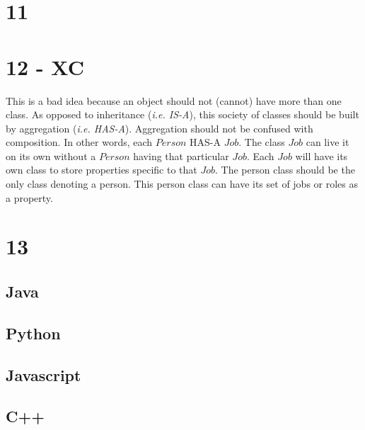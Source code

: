 \documentclass[11pt, oneside]{article}
\begin{document}
\section*{11}

\section*{12 - XC}
This is a bad idea because an object should not (cannot) have more than one class. As opposed to inheritance (\textit{i.e. IS-A}), this society of classes should be built by aggregation (\textit{i.e. HAS-A}). Aggregation should not be confused with composition. In other words, each $Person$ HAS-A $Job$. The class $Job$ can live it on its own without a $Person$ having that particular $Job$. Each $Job$ will have its own class to store properties specific to that $Job$. The person class should be the only class denoting a person. This person class can have its set of jobs or roles as a property.

\section*{13}

\subsection*{Java}

\subsection*{Python}

\subsection*{Javascript}

\subsection*{C++}

\end{document}
